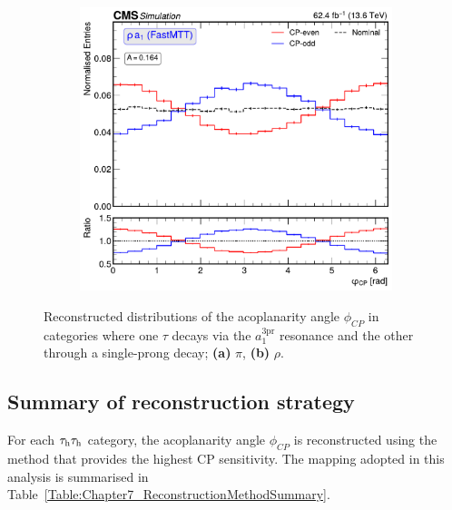 \begin{figure}[!htbp]
\begin{subfigure}[b]{0.49\textwidth}
            \includegraphics[width=\textwidth]{Figures/Chapter7/Acoplanarity/With_IP/aco_rho_a1_FASTMTT_MassConstraint.pdf}
            \caption{}
        \end{subfigure}
    \caption[Reconstructed $\phi_{CP}$ distributions with the combined IP/NP--PV method.]
    {Reconstructed distributions of the acoplanarity angle $\phi_{CP}$ in categories where one $\tau$ decays via the $a_1^{3\mathrm{pr}}$ resonance and the other through a single-prong decay; \textbf{(a)} $\pi$, \textbf{(b)} $\rho$.}
    \label{Figure:CPDist_Combined_IPNP_PV}
\end{figure}

\subsection{Summary of reconstruction strategy}
\label{Section:Chapter7_MethodSummary}

For each $\tau_\mathrm{h}\tau_\mathrm{h}$ category, the acoplanarity angle $\phi_{CP}$ is reconstructed using the method that provides the highest CP sensitivity. The mapping adopted in this analysis is summarised in Table~\ref{Table:Chapter7_ReconstructionMethodSummary}.


